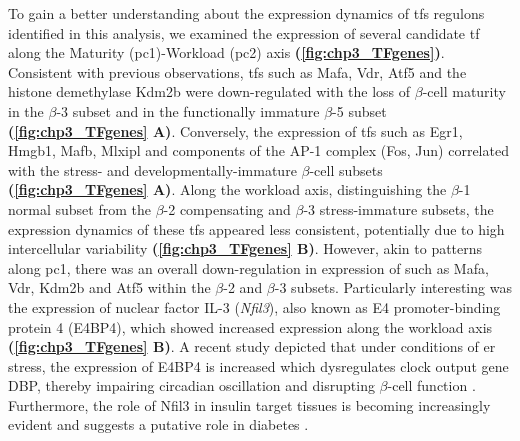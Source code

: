 


\par To gain a better understanding about the expression dynamics of \glspl{tf} regulons identified in this analysis, we examined the expression of several candidate \gls{tf} along the Maturity (\gls{pc}1)-Workload (\gls{pc}2) axis \textbf{(\autoref{fig:chp3_TFgenes})}. Consistent with previous observations, \glspl{tf} such as Mafa, Vdr, Atf5 and the histone demethylase Kdm2b were down-regulated with the loss of $\beta$-cell maturity in the $\beta$-3 subset and in the functionally immature $\beta$-5 subset \textbf{(\autoref{fig:chp3_TFgenes} A)}. Conversely, the expression of \glspl{tf} such as Egr1, Hmgb1, Mafb, Mlxipl and components of the AP-1 complex (Fos, Jun) correlated with the stress- and developmentally-immature $\beta$-cell subsets \textbf{(\autoref{fig:chp3_TFgenes} A)}. Along the workload axis, distinguishing the $\beta$-1 normal subset from the $\beta$-2 compensating and $\beta$-3 stress-immature subsets, the expression dynamics of these \glspl{tf} appeared less consistent, potentially due to high intercellular variability \textbf{(\autoref{fig:chp3_TFgenes} B)}. However, akin to patterns along \gls{pc}1, there was an overall down-regulation in expression of such as Mafa, Vdr, Kdm2b and Atf5 within the $\beta$-2 and $\beta$-3 subsets. Particularly interesting was the expression of nuclear factor IL-3 (\textit{Nfil3}), also known as E4 promoter-binding protein 4 (E4BP4), which showed increased expression along the workload axis \textbf{(\autoref{fig:chp3_TFgenes} B)}. A recent study depicted that under conditions of \gls{er} stress, the expression of E4BP4 is increased which dysregulates clock output gene DBP, thereby impairing circadian oscillation and disrupting $\beta$-cell function \textbf{\cite{ohta_clock_2017}}. Furthermore, the role of Nfil3 in insulin target tissues is becoming increasingly evident and suggests a putative role in diabetes \textbf{\cite{keniry_new_nodate}}.\\

